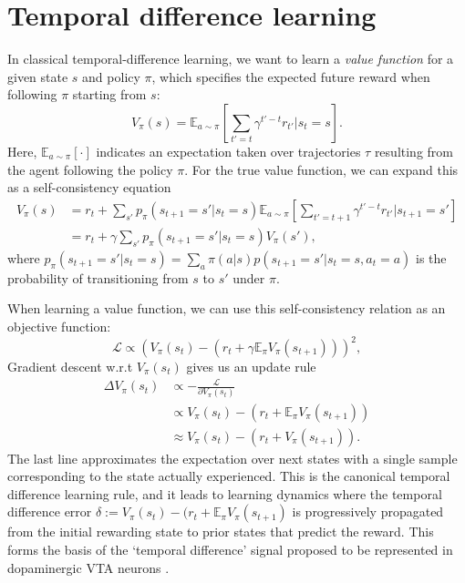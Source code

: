 \section{Temporal difference learning}
\label{sec:temporal_difference}

In classical temporal-difference learning, we want to learn a \emph{value function} for a given state $s$ and policy $\pi$, which specifies the expected future reward when following $\pi$ starting from $s$:
\begin{equation}
    \label{eq:V-values}
    V_{\pi}(s) = \mathbb{E}_{a \sim \pi} \left [ \sum_{t' = t} \gamma^{t' - t} r_{t'} | s_t = s \right ].
\end{equation}
Here, $\mathbb{E}_{a \sim \pi} [ \cdot ]$ indicates an expectation taken over trajectories $\tau$ resulting from the agent following the policy $\pi$.
For the true value function, we can expand this as a self-consistency equation
\begin{align}
    \label{eq:value_expansion}
    V_{\pi}(s) &= r_t + \sum_{s'} p_{\pi}(s_{t+1} = s' | s_t = s) \mathbb{E}_{a \sim \pi} \left [ \sum_{t' = t+1} \gamma^{t' - t} r_{t'} | s_{t+1} = s' \right ] \\
    &=  r_t + \gamma \sum_{s'} p_{\pi}(s_{t+1} = s' | s_t = s) V_{\pi}(s'),
\end{align}
where $p_{\pi}(s_{t+1} = s' | s_t = s) = \sum_a \pi(a|s) p(s_{t+1} = s' | s_t = s, a_t = a)$ is the probability of transitioning from $s$ to $s'$ under $\pi$.

When learning a value function, we can use this self-consistency relation as an objective function:
\begin{equation}
    \mathcal{L} \propto \left (  V_\pi(s_t) - (r_t + \gamma \mathbb{E}_\pi V_{\pi}(s_{t+1})) \right )^2,
\end{equation}
Gradient descent w.r.t $V_\pi(s_t)$ gives us an update rule
\begin{align}
    \label{eq:TD-learning}
    \Delta V_\pi(s_t) &\propto - \frac{\mathcal{L}}{\partial V_\pi(s_t)}\\
    &\propto V_\pi(s_t) - (r_t + \mathbb{E}_\pi V_{\pi}(s_{t+1}))\\
    &\approx V_\pi(s_t) - (r_t + V_{\pi}(s_{t+1})).
\end{align}
The last line approximates the expectation over next states with a single sample corresponding to the state actually experienced.
This is the canonical temporal difference learning rule, and it leads to learning dynamics where the temporal difference error $\delta := V_\pi(s_t) - (r_t + \mathbb{E}_\pi V_{\pi}(s_{t+1})$ is progressively propagated from the initial rewarding state to prior states that predict the reward.
This forms the basis of the `temporal difference' signal proposed to be represented in dopaminergic VTA neurons \citep{schultz1997neural}.

